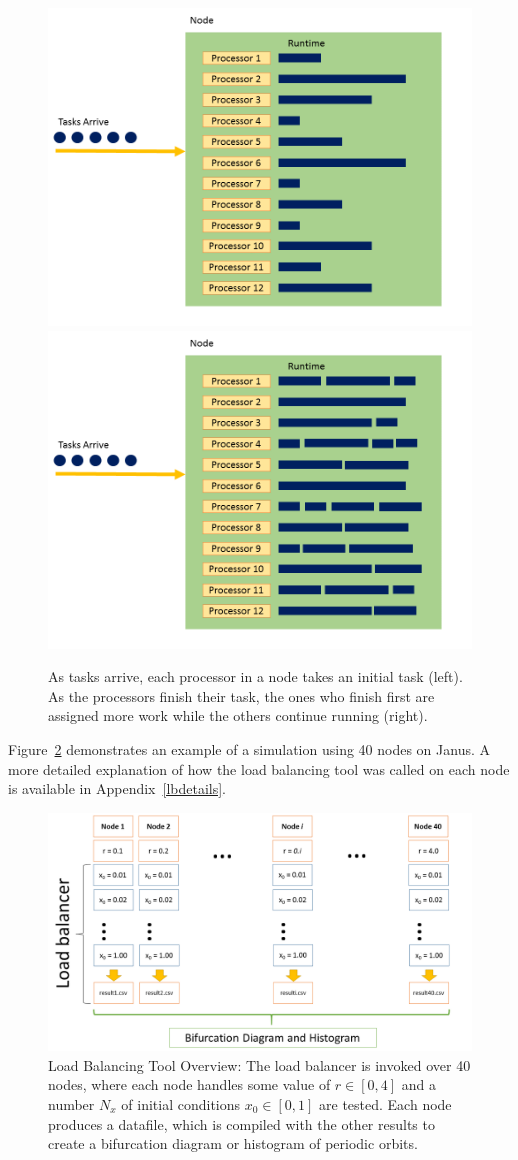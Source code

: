 \begin{figure}[!h]
\caption[Processor Work distribution before and after load
balancing]{As tasks arrive, each processor in a node takes an initial
  task (left). As the processors finish their task, the ones who finish first are
assigned more work while the others continue running (right).}\label{fig:loadbalance_node}
\centering
\includegraphics[width=.5\textwidth]{figs/loadbalance_node_start.png}\hfill
\includegraphics[width=.5\textwidth]{figs/loadbalance_node_end.png}
\end{figure}
Figure~\ref{fig:lbtool} demonstrates an example of a simulation
using 40 nodes on Janus. A more detailed explanation of how the load
balancing tool was called on each node is available in
Appendix~\ref{lbdetails}. 
\begin{figure}[H]\linespread{1}   
\caption[Load Balancing Tool Overview]{Load Balancing Tool Overview:
  The load balancer is invoked over 40 nodes, where each node handles
  some value of $r \in [0,4]$ and a number $N_x$ of initial conditions
  $x_0 \in [0,1]$ are tested. Each node produces a datafile, which is
  compiled with the other results to create a bifurcation diagram or
  histogram of periodic orbits.}\label{fig:lbtool}
	\begin{center}
          \includegraphics[scale=0.45]{figs/load_balancer.png}
	\end{center}
\end{figure}

